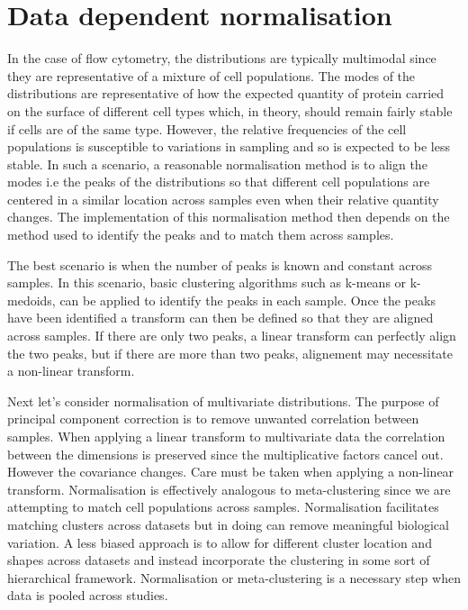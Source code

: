 \section{Data dependent normalisation}

In the case of flow cytometry, the distributions are typically multimodal since they are representative of a mixture of cell populations.
The modes of the distributions are representative of how the expected quantity of protein carried on the surface of different cell types which,
in theory, should remain fairly stable if cells are of the same type.
However, the relative frequencies of the cell populations is susceptible to variations in sampling and so is expected to be less stable.
In such a scenario, a reasonable normalisation method is to align the modes i.e the peaks of the distributions so that different cell populations are centered
in a similar location across samples even when their relative quantity changes.
The implementation of this normalisation method then depends on the method used to identify the peaks and to match them across samples.

The best scenario is when the number of peaks is known and constant across samples.
In this scenario, basic clustering algorithms such as k-means or k-medoids, can be applied to identify the peaks in each sample.
Once the peaks have been identified a transform can then be defined so that they are aligned across samples.
If there are only two peaks, a linear transform can perfectly align the two peaks, but if there are more than two peaks, alignement may necessitate a non-linear transform.

Next let's consider normalisation of multivariate distributions.  
The purpose of principal component correction is to remove unwanted correlation between samples.
When applying a linear transform to multivariate data the correlation between the dimensions is preserved since the multiplicative factors cancel out.
However the covariance changes.
Care must be taken when applying a non-linear transform.  
Normalisation is effectively analogous to meta-clustering since we are attempting to match cell populations across samples.  
Normalisation facilitates matching clusters across datasets but in doing can remove meaningful biological variation.  
A less biased approach is to allow for different cluster location and shapes across datasets and instead incorporate the clustering in some sort of hierarchical framework.  
Normalisation or meta-clustering is a necessary step when data is pooled across studies.



